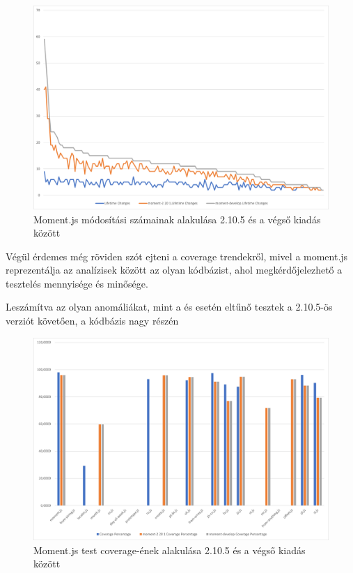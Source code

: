 \begin{figure}[H]
    \centering
    \includegraphics[width=1\textwidth]{images/moment/moment-all-changes.png}
    \caption{Moment.js módosítási számainak alakulása 2.10.5 és a végső kiadás között}
    \label{fig:moment-all-changes}
\end{figure}

Végül érdemes még röviden szót ejteni a coverage trendekről, mivel a moment.js reprezentálja az analízisek között az olyan kódbázist, ahol megkérdőjelezhető a tesztelés mennyisége és minősége.

Leszámítva az olyan anomáliákat, mint a  és  esetén eltűnő tesztek a 2.10.5-ös verziót követően, a kódbázis nagy részén

\begin{figure}[H]
    \centering
    \includegraphics[width=1\textwidth]{images/moment/moment-all-coverage.png}
    \caption{Moment.js test coverage-ének alakulása 2.10.5 és a végső kiadás között}
    \label{fig:moment-all-coverage}
\end{figure}

